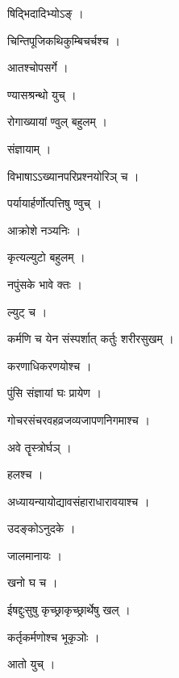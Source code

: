 \documentclass[10pt, openany]{book}
\begin{document}
\noindent षिद्भिदादिभ्योऽङ् ।

\noindent चिन्तिपूजिकथिकुम्बिचर्चश्च ।

\noindent आतश्चोपसर्गे ।

\noindent ण्यासश्रन्थो युच् ।

\noindent रोगाख्यायां ण्वुल् बहुलम् ।

\noindent संज्ञायाम् ।

\noindent विभाषाऽऽख्यानपरिप्रश्नयोरिञ् च ।

\noindent पर्यायार्हर्णोत्पत्तिषु ण्वुच् ।

\noindent आक्रोशे नञ्यनिः ।

\noindent कृत्यल्युटो बहुलम् ।

\noindent नपुंसके भावे क्तः ।

\noindent ल्युट् च ।

\noindent कर्मणि च येन संस्पर्शात् कर्तुः शरीरसुखम् ।

\noindent करणाधिकरणयोश्च ।

\noindent पुंसि संज्ञायां घः प्रायेण ।

\noindent गोचरसंचरवहव्रजव्यजापणनिगमाश्च ।

\noindent अवे तॄस्त्रोर्घञ् ।

\noindent हलश्च ।

\noindent अध्यायन्यायोद्यावसंहाराधारावयाश्च ।

\noindent उदङ्कोऽनुदके ।

\noindent जालमानायः ।

\noindent खनो घ च ।

\noindent ईषद्दुःसुषु कृच्छ्राकृच्छ्रार्थेषु खल् ।

\noindent कर्तृकर्मणोश्च भूकृञोः ।

\noindent आतो युच् ।
\end{document}
